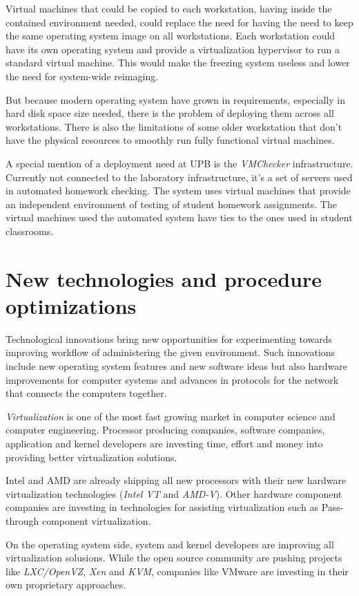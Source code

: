 Virtual machines that could be copied to each workstation, having inside
the contained environment needed, could replace the need for having the
need to keep the same operating system image on all workstations. Each
workstation could have its own operating system and provide a
virtualization hypervisor to run a standard virtual machine. This would
make the freezing system useless and lower the need for system-wide
reimaging.

But because modern operating system have grown in requirements,
especially in hard disk space size needed, there is the problem of
deploying them across all workstations. There is also the limitations of
some older workstation that don't have the physical resources to
smoothly run fully functional virtual machines.

A special mention of a deployment need at UPB is the \emph{VMChecker}
infrastructure. Currently not connected to the laboratory
infrastructure, it's a set of servers used in automated homework
checking. The system uses virtual machines that provide an independent
environment of testing of student homework assignments. The virtual
machines used the automated system have ties to the ones used in student
classrooms.

\section{New technologies and procedure optimizations}


Technological innovations bring new opportunities for experimenting
towards improving workflow of administering the given environment. Such
innovations include new operating system features and new software ideas
but also hardware improvements for computer systems and advances in
protocols for the network that connects the computers together.


\emph{Virtualization} is one of the most fast growing market in computer
science and computer engineering. Processor producing companies,
software companies, application and kernel developers are investing
time, effort and money into providing better virtualization solutions.

Intel and AMD are already shipping all new processors with their new
hardware virtualization technologies (\emph{\ac{Intel VT}} and
\emph{\ac{AMD-V}}).
Other hardware component companies are investing in technologies for
assisting virtualization such as Pass-through component virtualization.

On the operating system side, system and kernel developers are improving
all virtualization solusions. While the open source community are
pushing projects like \emph{\ac{LXC}/OpenVZ}, \emph{\ac{Xen}} and
\emph{\ac{KVM}},
companies like VMware are investing in their own proprietary approaches.

